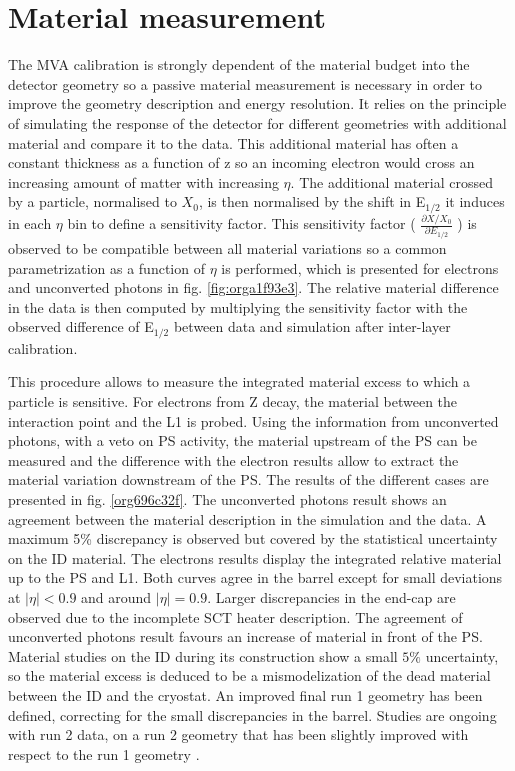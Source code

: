 \section{Material measurement}
\label{sec:orgf6d3909}
The MVA calibration is strongly dependent of the material budget into the detector geometry so a passive material measurement is necessary in order to improve the geometry description and energy resolution.
It relies on the principle of simulating the response of the detector for different geometries \cite{ATL-COM-PHYS-2013-1644} with additional material and compare it to the data.
This additional material has often a constant thickness as a function of z so an incoming electron would cross an increasing amount of matter with increasing $\eta$.
The additional material crossed by a particle, normalised to $X_0$, is then normalised by the shift in E\(_{\text{1/2}}\) it induces in each $\eta$ bin to define a sensitivity factor.
This sensitivity factor ( \(\frac{\partial X/X_0}{\partial E_{1/2}}\) ) is observed to be compatible between all material variations so a common parametrization as a function of $\eta$ is performed, which is presented for electrons and unconverted photons in fig. \ref{fig:orga1f93e3}.
The relative material difference in the data is then computed by multiplying the sensitivity factor with the observed difference of E\(_{\text{1/2}}\) between data and simulation after inter-layer calibration.

This procedure allows to measure the integrated material excess to which a particle is sensitive.
For electrons from Z decay, the material between the interaction point and the L1 is probed.
Using the information from unconverted photons, with a veto on PS activity, the material upstream of the PS can be measured and the difference with the electron results allow to extract the material variation downstream of the PS.
The results of the different cases are presented in fig. \ref{org696c32f}.
The unconverted photons result shows an agreement between the material description in the simulation and the data.
A maximum 5\% discrepancy is observed but covered by the statistical uncertainty on the ID material.
The electrons results display the integrated relative material up to the PS and L1.
Both curves agree in the barrel except for small deviations at $|\eta|<0.9$ and around $|\eta|=0.9$.
Larger discrepancies in the end-cap are observed due to the incomplete SCT heater description.
The agreement of unconverted photons result favours an increase of material in front of the PS.
Material studies on the ID during its construction \cite{ATLASExperiment} show a small $5 \%$ uncertainty, so the material excess is deduced to be a mismodelization of the dead material between the ID and the cryostat.
An improved final run 1 geometry has been defined, correcting for the small discrepancies in the barrel.
Studies are ongoing \cite{ATL-COM-PHYS-2017-759} with run 2 data, on a run 2 geometry that has been slightly improved with respect to the run 1 geometry \cite{141022_Unal}.

